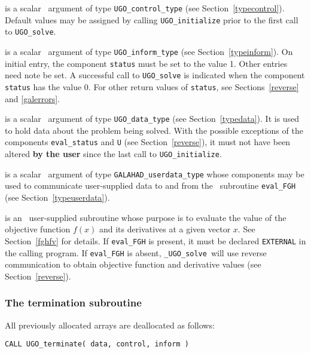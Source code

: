 \documentclass{galahad}
\newcommand{\packagename}{UGO}
\newcommand{\fullpackagename}{\libraryname\_\packagename}
\newcommand{\solver}{{\tt \fullpackagename\_solve}}
\begin{document}
\begin{description}
 is a scalar \intentin\ argument of type
{\tt \packagename\_control\_type}
(see Section~\ref{typecontrol}). Default values may be assigned by calling
{\tt \packagename\_initialize} prior to the first call to
{\tt \packagename\_solve}.

 is a scalar \intentinout\ argument of type
{\tt \packagename\_inform\_type}
(see Section~\ref{typeinform}).
On initial entry, the  component {\tt status} must be set to the value 1.
Other entries need note be set.
A successful call to
{\tt \packagename\_solve}
is indicated when the  component {\tt status} has the value 0.
For other return values of {\tt status}, see Sections~\ref{reverse} and
\ref{galerrors}.

 is a scalar \intentinout\ argument of type
{\tt \packagename\_data\_type}
(see Section~\ref{typedata}). It is used to hold data about the problem being
solved. With the possible exceptions of the components
{\tt eval\_status} and {\tt U} (see Section~\ref{reverse}),
it must not have been altered {\bf by the user} since the last call to
{\tt \packagename\_initialize}.

 is a scalar \intentinout\ argument of type
{\tt GALAHAD\_userdata\_type} whose components may be used
to communicate user-supplied data to and from the
\optional\ subroutine {\tt eval\_FGH}
(see Section~\ref{typeuserdata}).

 is an \optional\
user-supplied subroutine whose purpose is to evaluate the value of the
objective function $f(x)$ and its derivatives at a given vector $x$.
See Section~\ref{fghfv} for details. If {\tt eval\_FGH} is present,
it must be declared {\tt EXTERNAL} in the calling program.
If {\tt eval\_FGH} is absent, \solver\ will use reverse communication to
obtain objective function and derivative values (see Section~\ref{reverse}).

\end{description}


\subsubsection{The  termination subroutine}
All previously allocated arrays are deallocated as follows:
\vspace*{1mm}

\hspace{8mm}
{\tt CALL \packagename\_terminate( data, control, inform )}
\end{document}
